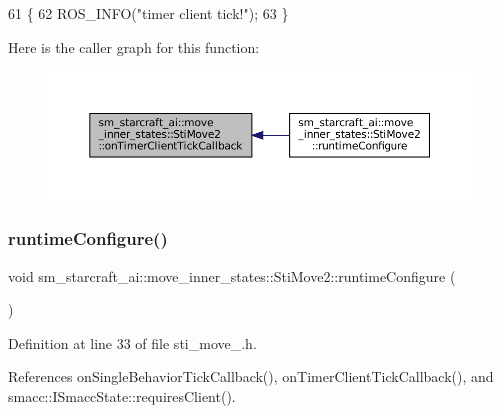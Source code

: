 \begin{DoxyCode}
61   \{
62     ROS\_INFO(\textcolor{stringliteral}{"timer client tick!"});
63   \}
\end{DoxyCode}
Here is the caller graph for this function\+:
\nopagebreak
\begin{figure}[H]
\begin{center}
\leavevmode
\includegraphics[width=350pt]{structsm__starcraft__ai_1_1move__inner__states_1_1StiMove2_a1a2c7056ff3fe7a55f1d9a08a29b374f_icgraph}
\end{center}
\end{figure}
\mbox{\label{structsm__starcraft__ai_1_1move__inner__states_1_1StiMove2_ab3b82e554437f2d8140a55da2d23ea51}} 
\subsubsection{\texorpdfstring{runtime\+Configure()}{runtimeConfigure()}}
{\footnotesize\ttfamily void sm\+\_\+starcraft\+\_\+ai\+::move\+\_\+inner\+\_\+states\+::\+Sti\+Move2\+::runtime\+Configure (\begin{DoxyParamCaption}{ }\end{DoxyParamCaption})\hspace{0.3cm}{\ttfamily [inline]}}



Definition at line 33 of file sti\+\_\+move\+\_.\+h.



References on\+Single\+Behavior\+Tick\+Callback(), on\+Timer\+Client\+Tick\+Callback(), and smacc\+::\+I\+Smacc\+State\+::requires\+Client().



